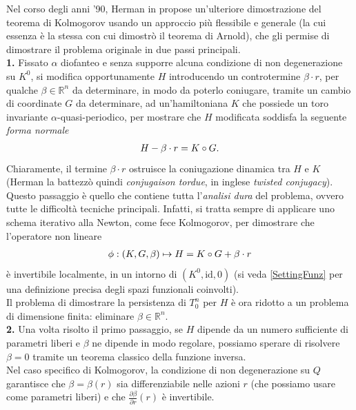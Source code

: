 \documentclass[twoside, 11pt]{amsbook}
\newcommand{\0}{{(0)}}
\newcommand{\3}{{(3)}}
\theoremstyle{colonplain}
\theoremstyle{colondefinition}
\theoremstyle{colonremark}
\numberwithin{equation}{chapter}
\begin{document}
Nel corso degli anni '90, Herman in \cite{Herman} propose un'ulteriore dimostrazione del teorema di Kolmogorov usando un approccio più flessibile e generale (la cui essenza è la stessa con cui dimostrò il teorema di Arnold), che gli permise di dimostrare il problema originale in due passi principali. \\
\textbf{1.} Fissato $\alpha$ diofanteo e senza supporre alcuna condizione di non degenerazione su $K^0$, si modifica opportunamente $H$ introducendo un controtermine $\beta \cdot r$, per qualche $\beta \in \mathbb{R}^n$ da determinare, in modo da poterlo coniugare, tramite un cambio di coordinate $G$ da determinare, ad un'hamiltoniana $K$ che possiede un toro invariante $\alpha$-quasi-periodico, per mostrare che $H$ modificata soddisfa la seguente \textit{forma normale}
\begin{align}
    H - \beta \cdot r = K \circ G. \notag
\end{align}
Chiaramente, il termine $\beta \cdot r$ ostruisce la coniugazione dinamica tra $H$ e $K$ (Herman la battezzò quindi \textit{conjugaison tordue}, in inglese \textit{twisted conjugacy}). \\
Questo passaggio è quello che contiene tutta l'\textit{analisi dura} del problema, ovvero tutte le difficoltà tecniche principali. Infatti, si tratta sempre di applicare uno schema iterativo alla Newton, come fece Kolmogorov, per dimostrare che l'operatore non lineare
\begin{align}
    \phi : (K, G, \beta) \mapsto H = K \circ G + \beta \cdot r \notag
\end{align}
è invertibile localmente, in un intorno di $(K^0, \mathrm{id}, 0)$ (si veda \ref{SettingFunz} per una definizione precisa degli spazi funzionali coinvolti). \\
Il problema di dimostrare la persistenza di $T^n_0$ per $H$ è ora ridotto a un problema di dimensione finita: eliminare $\beta \in \mathbb{R}^n$. \\
\textbf{2.} Una volta risolto il primo passaggio, se $H$ dipende da un numero sufficiente di parametri liberi e $\beta$ ne dipende in modo regolare, possiamo sperare di risolvere $\beta = 0$ tramite un teorema classico della funzione inversa. \\
Nel caso specifico di Kolmogorov, la condizione di non degenerazione su $Q$ garantisce che $\beta = \beta(r)$ sia differenziabile nelle azioni $r$ (che possiamo usare come parametri liberi) e che $\frac{\partial \beta}{\partial r}(r)$ è invertibile. \\ \\
\end{document}
